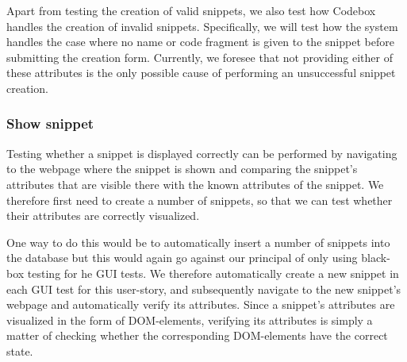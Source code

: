 \documentclass[10pt,a4paper,BCOR12mm, headexclude, footexclude,
  twoside, openright]{scrartcl}
\numberwithin{equation}{section} %
\numberwithin{figure}{section} %
\numberwithin{table}{section} %
\begin{document}
Apart from testing the creation of valid snippets, we also test how Codebox handles the creation of invalid snippets.
Specifically, we will test how the system handles the case where no name or code fragment is given to the snippet before submitting the creation form.
Currently, we foresee that not providing either of these attributes is the only possible cause of performing an unsuccessful snippet creation. 

\subsubsection*{Show snippet}

Testing whether a snippet is displayed correctly can be performed by navigating to the webpage where the snippet is shown and comparing the snippet's attributes that are visible there with the known attributes of the snippet.
We therefore first need to create a number of snippets, so that we can test whether their attributes are correctly visualized.

One way to do this would be to automatically insert a number of snippets into the database but this would again go against our principal of only using black-box testing for he GUI tests.
We therefore automatically create a new snippet in each GUI test for this user-story, and subsequently navigate to the new snippet's webpage and automatically verify its attributes.
Since a snippet's attributes are visualized in the form of DOM-elements, verifying its attributes is simply a matter of checking whether the corresponding DOM-elements have the correct state.
\end{document}
